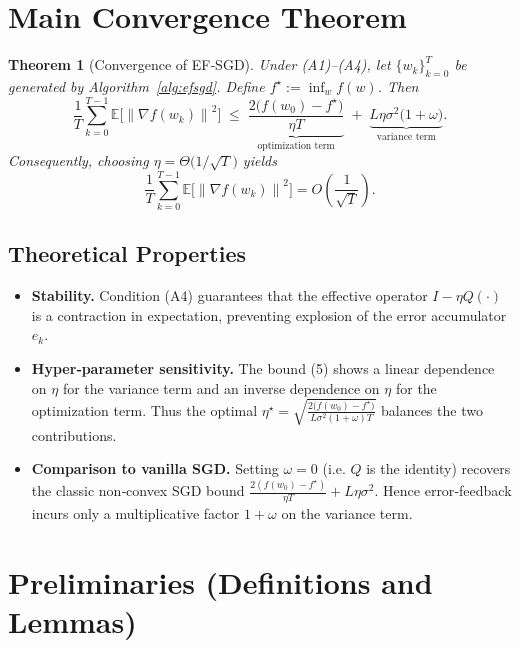 \documentclass{article}
\newtheorem{theorem}{Theorem}
\newcommand{\E}{\mathbb{E}}
\newcommand{\norm}[1]{\left\|#1\right\|}
\begin{document}
\section*{Main Convergence Theorem}
\begin{theorem}[Convergence of EF‑SGD]\label{thm:main}
Under (A1)–(A4), let $\{w_k\}_{k=0}^{T}$ be generated by Algorithm~\ref{alg:efsgd}.
Define $f^\star:=\inf_{w}f(w)$. Then
\[
\frac{1}{T}\sum_{k=0}^{T-1}\E\!\bigl[\norm{\nabla f(w_k)}^2\bigr]
\;\le\;
\underbrace{\frac{2\bigl(f(w_0)-f^\star\bigr)}{\eta T}}_{\text{optimization term}}
\;+\;
\underbrace{L\eta\sigma^2\bigl(1+\omega\bigr)}_{\text{variance term}} .
\tag{5}
\]
Consequently, choosing $\eta =\Theta\!\bigl(1/\sqrt{T}\bigr)$ yields
\[
\frac{1}{T}\sum_{k=0}^{T-1}\E\!\bigl[\norm{\nabla f(w_k)}^2\bigr]
=O\!\left(\frac{1}{\sqrt{T}}\right).
\]
\end{theorem}

\subsection*{Theoretical Properties}
\begin{itemize}
\item \textbf{Stability.} Condition (A4) guarantees that the effective
operator $I-\eta Q(\cdot)$ is a contraction in expectation, preventing
explosion of the error accumulator $e_k$.
\item \textbf{Hyper‑parameter sensitivity.}
The bound (5) shows a linear dependence on $\eta$ for the variance term
and an inverse dependence on $\eta$ for the optimization term.
Thus the optimal $\eta^\star = \sqrt{\frac{2\bigl(f(w_0)-f^\star\bigr)}{L\sigma^2(1+\omega)T}}$
balances the two contributions.
\item \textbf{Comparison to vanilla SGD.}
Setting $\omega=0$ (i.e. $Q$ is the identity) recovers the classic
non‑convex SGD bound
$\frac{2(f(w_0)-f^\star)}{\eta T}+L\eta\sigma^2$.
Hence error‑feedback incurs only a multiplicative factor $1+\omega$ on the
variance term.
\end{itemize}

\section*{Preliminaries (Definitions and Lemmas)}
\end{document}
